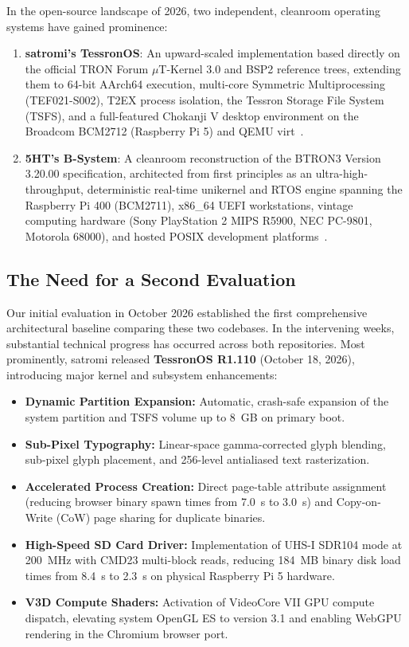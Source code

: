 \documentclass[10pt,journal,compsoc,twocolumn]{article}
\begin{document}
In the open-source landscape of 2026, two independent, cleanroom operating systems have gained prominence:
\begin{enumerate}[leftmargin=*]
    \item \textbf{satromi's TessronOS}: An upward-scaled implementation based directly on the official TRON Forum $\mu$T-Kernel 3.0 and BSP2 reference trees, extending them to 64-bit AArch64 execution, multi-core Symmetric Multiprocessing (TEF021-S002), T2EX process isolation, the Tessron Storage File System (TSFS), and a full-featured Chokanji V desktop environment on the Broadcom BCM2712 (Raspberry Pi 5) and QEMU virt~\cite{tessronos_repo}.
    \item \textbf{5HT's B-System}: A cleanroom reconstruction of the BTRON3 Version 3.20.00 specification, architected from first principles as an ultra-high-throughput, deterministic real-time unikernel and RTOS engine spanning the Raspberry Pi 400 (BCM2711), x86\_64 UEFI workstations, vintage computing hardware (Sony PlayStation 2 MIPS R5900, NEC PC-9801, Motorola 68000), and hosted POSIX development platforms~\cite{sokhatsky2026btron}.
\end{enumerate}

\subsection{The Need for a Second Evaluation}
Our initial evaluation in October 2026 established the first comprehensive architectural baseline comparing these two codebases. In the intervening weeks, substantial technical progress has occurred across both repositories. Most prominently, satromi released \textbf{TessronOS R1.110} (October 18, 2026), introducing major kernel and subsystem enhancements:
\begin{itemize}[leftmargin=*]
    \item \textbf{Dynamic Partition Expansion:} Automatic, crash-safe expansion of the system partition and TSFS volume up to 8~GB on primary boot.
    \item \textbf{Sub-Pixel Typography:} Linear-space gamma-corrected glyph blending, sub-pixel glyph placement, and 256-level antialiased text rasterization.
    \item \textbf{Accelerated Process Creation:} Direct page-table attribute assignment (reducing browser binary spawn times from 7.0~s to 3.0~s) and Copy-on-Write (CoW) page sharing for duplicate binaries.
    \item \textbf{High-Speed SD Card Driver:} Implementation of UHS-I SDR104 mode at 200~MHz with CMD23 multi-block reads, reducing 184~MB binary disk load times from 8.4~s to 2.3~s on physical Raspberry Pi 5 hardware.
    \item \textbf{V3D Compute Shaders:} Activation of VideoCore VII GPU compute dispatch, elevating system OpenGL ES to version 3.1 and enabling WebGPU rendering in the Chromium browser port.
\end{itemize}
\end{document}
